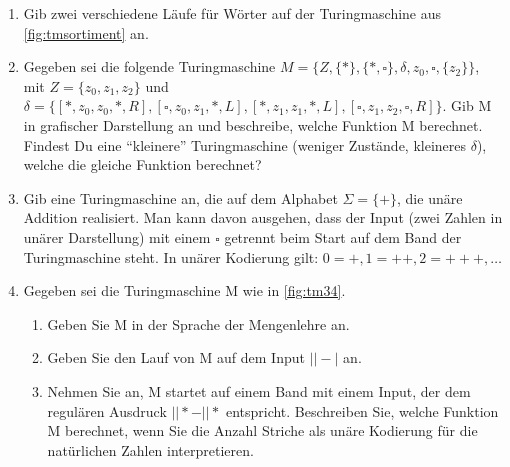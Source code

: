 \begin{enumerate}
    \item Gib zwei verschiedene Läufe für Wörter auf der Turingmaschine aus
        \autoref{fig:tmsortiment} an.
    \item Gegeben sei die folgende Turingmaschine
        $M = \{Z, \{*\}, \{*, \square\}, \delta, z_0, \square, \{z_2\}\}$,
        mit $Z = \{z_0, z_1, z_2\}$ und \\
        $\delta = \{
            [*,z_0,z_0,*,R],
            [\square,z_0,z_1,*,L],
            [*,z_1,z_1,*,L],
            [\square,z_1,z_2,\square,R]
        \}$.
        Gib M in grafischer Darstellung an und beschreibe, welche Funktion M berechnet.
        Findest Du eine ``kleinere'' Turingmaschine (weniger Zustände, kleineres $\delta$),
        welche die gleiche Funktion berechnet?
    \item Gib eine Turingmaschine an, die auf dem Alphabet $\Sigma = \{+\}$,
        die unäre Addition realisiert.
        Man kann davon ausgehen, dass der Input (zwei Zahlen in unärer Darstellung)
        mit einem $\square$ getrennt beim Start auf dem Band der Turingmaschine steht.
        In unärer Kodierung gilt: $0 = +, 1 = ++, 2 = +++, \ldots$
    \item Gegeben sei die Turingmaschine M wie in \autoref{fig:tm34}.
        \begin{enumerate}
            \item Geben Sie M in der Sprache der Mengenlehre an.
            \item Geben Sie den Lauf von M auf dem Input $||-|$ an.
            \item Nehmen Sie an, M startet auf einem Band mit einem Input,
                der dem regulären Ausdruck $||*-||*$ entspricht.
                Beschreiben Sie, welche Funktion M berechnet, wenn Sie die Anzahl Striche als
                unäre Kodierung für die natürlichen Zahlen interpretieren.
        \end{enumerate}
\end{enumerate}

